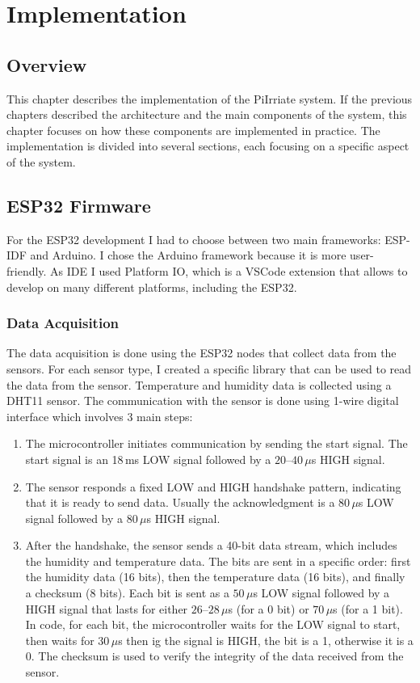 \chapter{Implementation}
\section{Overview}
This chapter describes the implementation of the PiIrriate system. If the previous chapters described the architecture and 
the main components of the system, this chapter focuses on how these components are implemented in practice.
The implementation is divided into several sections, each focusing on a specific aspect of the system.

\section {ESP32 Firmware}
For the ESP32 development I had to choose between two main frameworks: ESP-IDF and Arduino. I
chose the Arduino framework because it is more user-friendly. As IDE I used Platform IO, which is a VSCode extension
that allows to develop on many different platforms, including the ESP32\cite{platformio_docs}.

\subsection{Data Acquisition}
The data acquisition is done using the ESP32 nodes that collect data from the sensors.
For each sensor type, I created a specific library that can be used to read the data from the sensor.
Temperature and humidity data is collected using a DHT11 sensor. The communication with the sensor is done using
1-wire digital interface which involves 3 main steps\cite{1wire}:
\begin{enumerate}
  \item The microcontroller initiates communication by sending the start signal.
  The start signal is an 18\,ms LOW signal followed by a $20$--$40\,\mu$s HIGH signal.
  \item The sensor responds a fixed LOW and HIGH handshake pattern, indicating that it is ready to send data.
  Usually the acknowledgment is a $80\,\mu$s LOW signal followed by a $80\,\mu$s HIGH signal.
  \item After the handshake, the sensor sends a 40-bit data stream, which includes the humidity and temperature data.
  The bits are sent in a specific order: first the humidity data (16 bits), 
  then the temperature data (16 bits), 
  and finally a checksum (8 bits).
  Each bit is sent as a $50\,\mu$s LOW signal followed by a HIGH signal that lasts for either $26$--$28\,\mu$s (for a 0 bit) or $70\,\mu$s (for a 1 bit).
  In code, for each bit, the microcontroller waits for the LOW signal to start, 
  then waits for $30\,\mu$s then ig the signal is HIGH, the bit is a 1, otherwise it is a 0.
  The checksum is used to verify the integrity of the data received from the sensor.
\end{enumerate}

